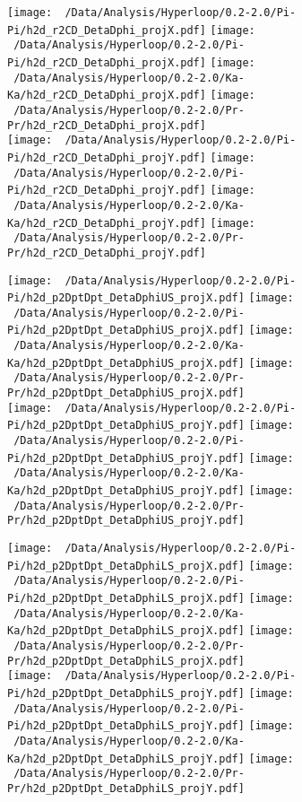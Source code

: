 \documentclass[ALICE,manyauthors]{ALICE_analysis_notes}
\begin{document}
\begin{figure}[h!]
	\hfill
	\centering
	\texttt{[image: ~/Data/Analysis/Hyperloop/0.2-2.0/Pi-Pi/h2d\_r2CD\_DetaDphi\_projX.pdf]}
	\texttt{[image: ~/Data/Analysis/Hyperloop/0.2-2.0/Pi-Pi/h2d\_r2CD\_DetaDphi\_projX.pdf]}
	\texttt{[image: ~/Data/Analysis/Hyperloop/0.2-2.0/Ka-Ka/h2d\_r2CD\_DetaDphi\_projX.pdf]}
	\texttt{[image: ~/Data/Analysis/Hyperloop/0.2-2.0/Pr-Pr/h2d\_r2CD\_DetaDphi\_projX.pdf]}
	\\
	\hfill
	\texttt{[image: ~/Data/Analysis/Hyperloop/0.2-2.0/Pi-Pi/h2d\_r2CD\_DetaDphi\_projY.pdf]}
	\texttt{[image: ~/Data/Analysis/Hyperloop/0.2-2.0/Pi-Pi/h2d\_r2CD\_DetaDphi\_projY.pdf]}
	\texttt{[image: ~/Data/Analysis/Hyperloop/0.2-2.0/Ka-Ka/h2d\_r2CD\_DetaDphi\_projY.pdf]}
	\texttt{[image: ~/Data/Analysis/Hyperloop/0.2-2.0/Pr-Pr/h2d\_r2CD\_DetaDphi\_projY.pdf]}
\end{figure}
\begin{figure}[h!]
	\hfill
	\centering
	\texttt{[image: ~/Data/Analysis/Hyperloop/0.2-2.0/Pi-Pi/h2d\_p2DptDpt\_DetaDphiUS\_projX.pdf]}
	\texttt{[image: ~/Data/Analysis/Hyperloop/0.2-2.0/Pi-Pi/h2d\_p2DptDpt\_DetaDphiUS\_projX.pdf]}
	\texttt{[image: ~/Data/Analysis/Hyperloop/0.2-2.0/Ka-Ka/h2d\_p2DptDpt\_DetaDphiUS\_projX.pdf]}
	\texttt{[image: ~/Data/Analysis/Hyperloop/0.2-2.0/Pr-Pr/h2d\_p2DptDpt\_DetaDphiUS\_projX.pdf]}
	\\
	\hfill
	\texttt{[image: ~/Data/Analysis/Hyperloop/0.2-2.0/Pi-Pi/h2d\_p2DptDpt\_DetaDphiUS\_projY.pdf]}
	\texttt{[image: ~/Data/Analysis/Hyperloop/0.2-2.0/Pi-Pi/h2d\_p2DptDpt\_DetaDphiUS\_projY.pdf]}
	\texttt{[image: ~/Data/Analysis/Hyperloop/0.2-2.0/Ka-Ka/h2d\_p2DptDpt\_DetaDphiUS\_projY.pdf]}
	\texttt{[image: ~/Data/Analysis/Hyperloop/0.2-2.0/Pr-Pr/h2d\_p2DptDpt\_DetaDphiUS\_projY.pdf]}
\end{figure}
\begin{figure}[h!]
	\hfill
	\centering
	\texttt{[image: ~/Data/Analysis/Hyperloop/0.2-2.0/Pi-Pi/h2d\_p2DptDpt\_DetaDphiLS\_projX.pdf]}
	\texttt{[image: ~/Data/Analysis/Hyperloop/0.2-2.0/Pi-Pi/h2d\_p2DptDpt\_DetaDphiLS\_projX.pdf]}
	\texttt{[image: ~/Data/Analysis/Hyperloop/0.2-2.0/Ka-Ka/h2d\_p2DptDpt\_DetaDphiLS\_projX.pdf]}
	\texttt{[image: ~/Data/Analysis/Hyperloop/0.2-2.0/Pr-Pr/h2d\_p2DptDpt\_DetaDphiLS\_projX.pdf]}
	\\
	\hfill
	\texttt{[image: ~/Data/Analysis/Hyperloop/0.2-2.0/Pi-Pi/h2d\_p2DptDpt\_DetaDphiLS\_projY.pdf]}
	\texttt{[image: ~/Data/Analysis/Hyperloop/0.2-2.0/Pi-Pi/h2d\_p2DptDpt\_DetaDphiLS\_projY.pdf]}
	\texttt{[image: ~/Data/Analysis/Hyperloop/0.2-2.0/Ka-Ka/h2d\_p2DptDpt\_DetaDphiLS\_projY.pdf]}
	\texttt{[image: ~/Data/Analysis/Hyperloop/0.2-2.0/Pr-Pr/h2d\_p2DptDpt\_DetaDphiLS\_projY.pdf]}
\end{figure}
\end{document}
